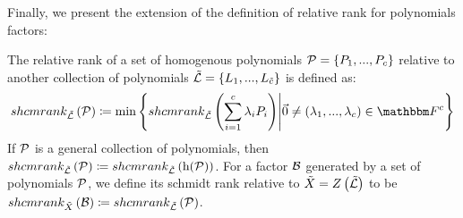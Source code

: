 
Finally, we present the extension of the definition of relative rank for polynomials factors:
\begin{definition}
    The relative rank of a set of homogenous polynomials $\genpolyset = \set{\genpoly_1,...,\genpoly_c}$
    relative to another collection of polynomials $\varpolyset = \set{\varpoly_1,...,\varpoly_\varietypolycount}$ is defined as:
    \[
        \relschmrank{\varpolyset}{\genpolyset} \definedas
        \min \set{\relschmrank{\varpolyset}{\sum_{i=1}^c{\lambda_i \genpoly_i}} \suchthat \vec{0} \neq (\lambda_1,...,\lambda_c) \in \basefield^c}
    \]
    If $\genpolyset$ is a general collection of polynomials, then $\relschmrank{\varpolyset}{\genpolyset} \definedas \relschmrank{\varpolyset}{\homopart{\genpolyset}}$.
    \newline
    For a factor $\mathcal{B}$ generated by a set of polynomials $\genpolyset$, we define its schmidt rank relative to $\variety = \zerofunc{\varpolyset}$
    to be $\relschmrank{\variety}{\factor} \definedas \relschmrank{\varpolyset}{\genpolyset}$.
\end{definition}


